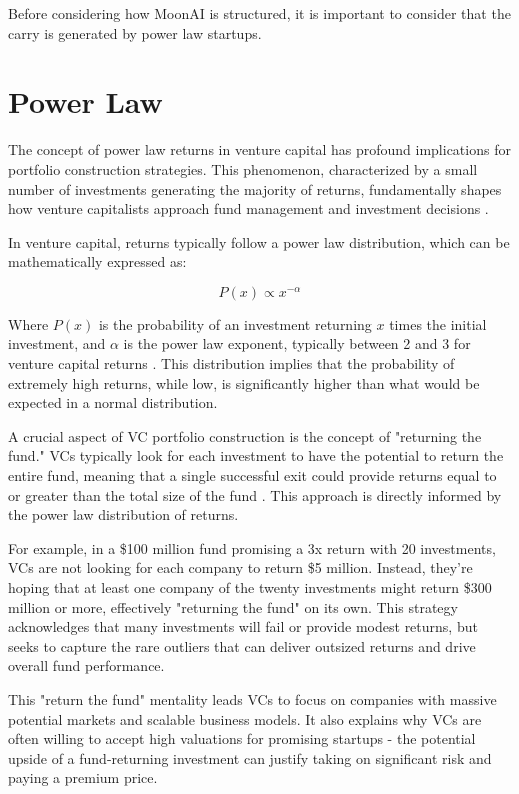 \documentclass[a4paper, oneside]{discothesis}
\begin{document}
Before considering how MoonAI is structured, it is important to consider that the carry is generated by power law startups. 

\section{Power Law}

The concept of power law returns in venture capital has profound implications for portfolio construction strategies. This phenomenon, characterized by a small number of investments generating the majority of returns, fundamentally shapes how venture capitalists approach fund management and investment decisions \cite{peter2015power}.

In venture capital, returns typically follow a power law distribution, which can be mathematically expressed as:

\begin{equation}
P(x) \propto x^{-\alpha}
\end{equation}

Where $P(x)$ is the probability of an investment returning $x$ times the initial investment, and $\alpha$ is the power law exponent, typically between 2 and 3 for venture capital returns \cite{clauset2009power}. This distribution implies that the probability of extremely high returns, while low, is significantly higher than what would be expected in a normal distribution.

A crucial aspect of VC portfolio construction is the concept of "returning the fund." VCs typically look for each investment to have the potential to return the entire fund, meaning that a single successful exit could provide returns equal to or greater than the total size of the fund \cite{feld2016venture}. This approach is directly informed by the power law distribution of returns.

For example, in a \$100 million fund promising a 3x return with 20 investments, VCs are not looking for each company to return \$5 million. Instead, they're hoping that at least one company of the twenty investments might return \$300 million or more, effectively "returning the fund" on its own. This strategy acknowledges that many investments will fail or provide modest returns, but seeks to capture the rare outliers that can deliver outsized returns and drive overall fund performance.

This "return the fund" mentality leads VCs to focus on companies with massive potential markets and scalable business models. It also explains why VCs are often willing to accept high valuations for promising startups - the potential upside of a fund-returning investment can justify taking on significant risk and paying a premium price.
\end{document}
